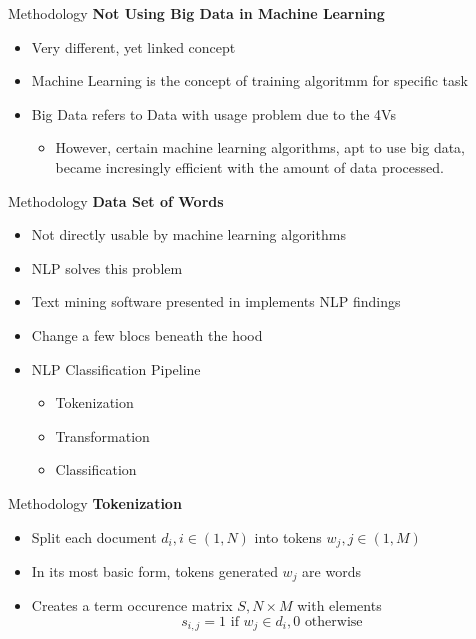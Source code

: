 \begin{frame}[label=metho]{Methodology}
	\textbf{Not Using Big Data in Machine Learning}
	\begin{itemize}
		\item Very different, yet linked concept
		\item Machine Learning is the concept of training algoritmm for specific task
		\item Big Data refers to Data with usage problem due to the 4Vs
		\begin{itemize}
			\item However, certain machine learning algorithms, apt to use big data, became incresingly efficient with the amount of data processed.
		\end{itemize}	
	\end{itemize}
\end{frame}


\begin{frame}[label=metho]{Methodology}
	\textbf{Data Set of Words}
	\begin{itemize}
		\item Not directly usable by machine learning algorithms
		\item NLP solves this problem
		\item Text mining software presented in \cite{francis2010text} implements NLP findings
		\item Change a few blocs beneath the hood
		\item NLP Classification Pipeline
		\begin{itemize}
			\item Tokenization
			\item Transformation
			\item Classification
		\end{itemize}	
	\end{itemize}
\end{frame}


\begin{frame}[label=metho]{Methodology}
	\textbf{Tokenization}
	\begin{itemize}
		\item Split each document $d_i, i \in(1, N)$ into tokens $w_j, j \in (1, M) $ 
		\item In its most basic form, tokens generated $w_j$ are words
		\item Creates a term occurence matrix $S, N \times M$ with elements
		$$ s_{i,j} = 1 \textrm{ if } w_j \in d_i, 0 \textrm{ otherwise}$$
	\end{itemize}
\end{frame}




